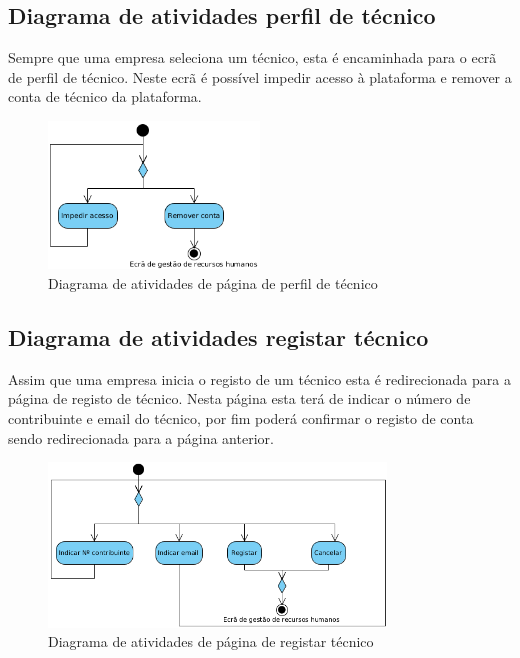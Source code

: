 \subsection{Diagrama de atividades perfil de técnico}

Sempre que uma empresa seleciona um técnico, esta é encaminhada para o ecrã de perfil de técnico. Neste 
ecrã é possível impedir acesso à plataforma e remover a conta de técnico da plataforma.

\begin{figure}[htb]
    \centering
    \includegraphics[width=0.5\textwidth]{images/diagramas/atividades/diagrama_atividades_prof_profile.png}
    \caption{Diagrama de atividades de página de perfil de técnico}
    \label{fig:30}
\end{figure}

\newpage

\subsection{Diagrama de atividades registar técnico}

Assim que uma empresa inicia o registo de um técnico esta é redirecionada para a página de registo de técnico.
Nesta página esta terá de indicar o número de contribuinte e email do técnico, por fim poderá confirmar o registo
de conta sendo redirecionada para a página anterior.

\begin{figure}[htb]
    \centering
    \includegraphics[width=0.8\textwidth]{images/diagramas/atividades/diagrama_atividades_add_professional.png}
    \caption{Diagrama de atividades de página de registar técnico}
    \label{fig:31}
\end{figure}

